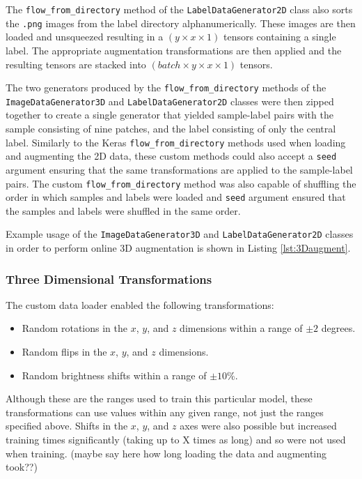 The \texttt{flow\_from\_directory} method of the \texttt{LabelDataGenerator2D} class also sorts the \texttt{.png} images from the label directory alphanumerically. These images are then loaded and unsqueezed resulting in a $(y \times x \times 1)$ tensors containing a single label. The appropriate augmentation transformations are then applied and the resulting tensors are stacked into $(batch \times y \times x \times 1)$ tensors.

The two generators produced by the \texttt{flow\_from\_directory} methods of the \texttt{ImageDataGenerator3D} and \texttt{LabelDataGenerator2D} classes were then zipped together to create a single generator that yielded sample-label pairs with the sample consisting of nine patches, and the label consisting of only the central label. Similarly to the Keras \texttt{flow\_from\_directory} methods used when loading and augmenting the 2D data, these custom methods could also accept a \texttt{seed} argument ensuring that the same transformations are applied to the sample-label pairs. The custom \texttt{flow\_from\_directory} method was also capable of shuffling the order in which samples and labels were loaded and \texttt{seed} argument ensured that the samples and labels were shuffled in the same order.

Example usage of the \texttt{ImageDataGenerator3D} and \texttt{LabelDataGenerator2D} classes in order to perform online 3D augmentation is shown in Listing \ref{lst:3Daugment}.

\subsubsection{Three Dimensional Transformations}
\label{sec:3daug}

The custom data loader enabled the following transformations:
\begin{itemize}
    \item Random rotations in the $x$, $y$, and $z$ dimensions within a range of $\pm 2$ degrees.
    \item Random flips in the $x$, $y$, and $z$ dimensions.
    \item Random brightness shifts within a range of $\pm 10$\%.
\end{itemize}
Although these are the ranges used to train this particular model, these transformations can use values within any given range, not just the ranges specified above. Shifts in the $x$, $y$, and $z$ axes were also possible but increased training times significantly (taking up to X times as long) and so were not used when training. (maybe say here how long loading the data and augmenting took??)

